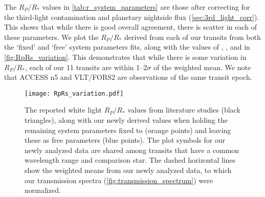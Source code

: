 \documentclass[twocolumn]{aastex63}
\begin{document}
The $R_P/R_*$ values in \autoref{tab:r_system_parameters} are those after correcting for the third-light contamination and planetary nightside flux (\autoref{sec:3rd_light_corr}). This shows that while there is good overall agreement, there is scatter in each of these parameters. We plot the $R_P/R_*$ derived from each of our transits from both the `fixed' and `free' system parameters fits, along with the values of \cite{Southworth2016}, \cite{Lendl2017}, \cite{Delrez2018} and \cite{Wilson2020} in \autoref{fig:RpRs_variation}. This demonstrates that while there is some variation in $R_P/R_*$, each of our 11 transits are within 1--2$\sigma$ of the weighted mean. We note that ACCESS n5 and VLT/FORS2 are observations of the same transit epoch. 

\begin{figure}
    \centering
    \texttt{[image: RpRs\_variation.pdf]}
    \caption{The reported white light $R_P/R_*$ values from literature studies (black triangles), along with our newly derived values when holding the remaining system parameters fixed to \protect\cite{Southworth2015} (orange points) and leaving these as free parameters (blue points). The plot symbols for our newly analyzed data are shared among transits that have a common wavelength range and comparison star. The dashed horizontal lines show the weighted means from our newly analyzed data, to which our transmission spectra (\autoref{fig:transmission_spectrum}) were normalized.}
    \label{fig:RpRs_variation}
\end{figure}
\end{document}
